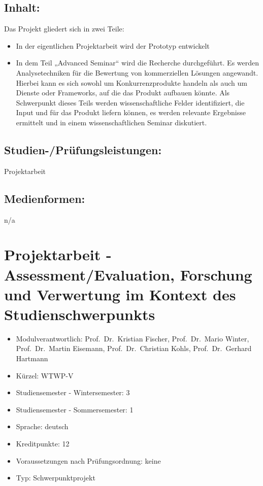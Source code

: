 \section*{Inhalt:}\label{inhalt-8}

Das Projekt gliedert sich in zwei Teile:

\begin{itemize}
\tightlist
\item
  In der eigentlichen Projektarbeit wird der Prototyp entwickelt
\item
  In dem Teil „Advanced Seminar`` wird die Recherche durchgeführt. Es
  werden Analysetechniken für die Bewertung von kommerziellen Lösungen
  angewandt. Hierbei kann es sich sowohl um Konkurrenzprodukte handeln
  als auch um Dienste oder Frameworks, auf die das Produkt aufbauen
  könnte. Als Schwerpunkt dieses Teils werden wissenschaftliche Felder
  identifiziert, die Input und für das Produkt liefern können, es werden
  relevante Ergebnisse ermittelt und in einem wissenschaftlichen Seminar
  diskutiert.
\end{itemize}

\section*{Studien-/Prüfungsleistungen:}\label{studien-pruxfcfungsleistungen-8}

Projektarbeit

\section*{Medienformen:}\label{medienformen-8}

n/a

\chapter{Projektarbeit - Assessment/Evaluation, Forschung und Verwertung
im Kontext des
Studienschwerpunkts}\label{projektarbeit---assessmentevaluation-forschung-und-verwertung-im-kontext-des-studienschwerpunkts}

\begin{itemize}
\tightlist
\item
  Modulverantwortlich: Prof.~Dr.~Kristian Fischer, Prof.~Dr.~Mario
  Winter, Prof.~Dr.~Martin Eisemann, Prof.~Dr.~Christian Kohls,
  Prof.~Dr.~Gerhard Hartmann
\item
  Kürzel: WTWP-V
\item
  Studiensemester - Wintersemester: 3
\item
  Studiensemester - Sommersemester: 1
\item
  Sprache: deutsch
\item
  Kreditpunkte: 12
\item
  Voraussetzungen nach Prüfungsordnung: keine
\item
  Typ: Schwerpunktprojekt
\end{itemize}

